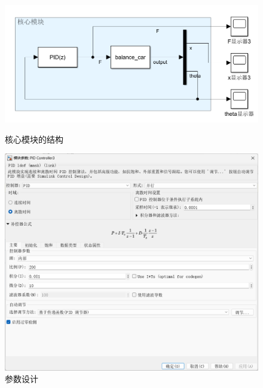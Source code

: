 \documentclass[12pt,a4paper,UTF8]{article}
\begin{document}
\begin{figure}[!htbp]
    \centering
    \begin{minipage}[b]{0.6\linewidth}
        \centering
        \includegraphics[width=0.9\linewidth]{figures/struc.png}
\caption{核心模块的结构}
         
    \end{minipage}%
    \begin{minipage}[b]{0.35\linewidth}
        \centering
        \includegraphics[width=0.8\linewidth]{figures/set1.png}
\caption{参数设计}
         
    \end{minipage}
\end{figure}
\end{document}
